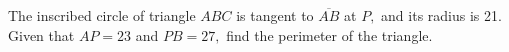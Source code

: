 The inscribed circle of triangle $ABC$ is tangent to $\overline{AB}$ at $P,$  and its radius is 21.  Given that $AP=23$ and $PB=27,$ find the perimeter of the triangle.